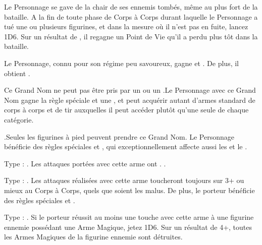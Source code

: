 \begin{multicols}{2}
Le Personnage se gave de la chair de ses ennemis tombés, même au plus fort de la bataille. A la fin de toute phase de Corps à Corps durant laquelle le Personnage a tué une ou plusieurs figurines, et dans la mesure où il n'est pas en fuite, lancez 1D6. Sur un résultat de , il regagne un Point de Vie qu'il a perdu plus tôt dans la bataille.

Le Personnage, connu pour son régime peu savoureux, gagne  et \stupidity{}. De plus, il obtient .

Ce Grand Nom ne peut pas être pris par un \wizard{} ou un \mammothhunter{}.\newline Le Personnage avec ce Grand Nom gagne la règle spéciale \weaponmaster{} et une \platearmour{}, et peut acquérir autant d'armes standard de corps à corps et de tir auxquelles il peut accéder plutôt qu'une seule de chaque catégorie.

.\newline Seules les figurines à pied peuvent prendre ce Grand Nom. Le Personnage bénéficie des règles spéciales \devastatingcharge{} et \thunderouscharge{}, qui exceptionnellement affecte aussi les \impacthits{} et le \stomp{}.

\endpricelistNSP
\end{multicols}

\closearmynewsection

\startarmymagicalitems

\armymagicalweapons

\startpricelist

Type : \gw{}. Les attaques portées avec cette arme ont . .

Type : \ironfist{}. Les attaques réalisées avec cette arme toucheront toujours sur 3+ ou mieux au Corps à Corps, quels que soient les malus. De plus, le porteur bénéficie des règles spéciales  et .

Type : \ironfist{}. Si le porteur réussit au moins une touche avec cette arme à une figurine ennemie possédant une Arme Magique, jetez 1D6. Sur un résultat de 4+, toutes les Armes Magiques de la figurine ennemie sont détruites.


